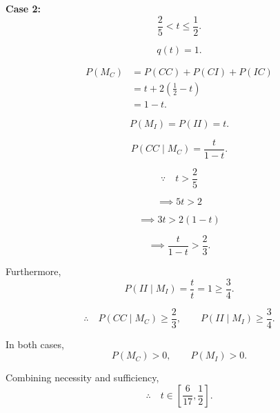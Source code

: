 \documentclass[11pt,a4paper]{article}
\begin{document}
\textbf{Case 2:}
\[
\frac25<t\leq\frac12.
\]

\[
q(t)=1.
\]

\[
\begin{aligned}
P(M_C)
&=P(CC)+P(CI)+P(IC)\\
&=t+2\left(\frac12-t\right)\\
&=1-t.
\end{aligned}
\]

\[
P(M_I)=P(II)=t.
\]

\[
P(CC\mid M_C)=\frac{t}{1-t}.
\]

\[
\because\quad t>\frac25
\]

\[
\implies
5t>2
\]

\[
\implies
3t>2(1-t)
\]

\[
\implies
\frac{t}{1-t}>\frac23.
\]

Furthermore,
\[
P(II\mid M_I)=\frac{t}{t}=1\geq\frac34.
\]

\[
\therefore\quad
P(CC\mid M_C)\geq\frac23,
\qquad
P(II\mid M_I)\geq\frac34.
\]

In both cases,
\[
P(M_C)>0,
\qquad
P(M_I)>0.
\]

Combining necessity and sufficiency,
\[
\therefore\quad
t\in\left[\frac6{17},\frac12\right].
\]
\end{document}
